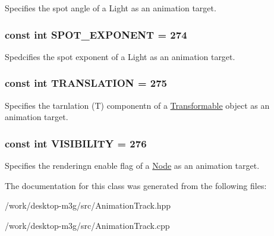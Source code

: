 Specifies the spot angle of a Light as an animation target. \hypertarget{classm3g_1_1AnimationTrack_90c55bd356e55166244416c6f758ea94}{
\subsubsection[{SPOT\_\-EXPONENT}]{\setlength{\rightskip}{0pt plus 5cm}const int {\bf SPOT\_\-EXPONENT} = 274}}
\label{classm3g_1_1AnimationTrack_90c55bd356e55166244416c6f758ea94}


Spedcifies the spot exponent of a Light as an animation target. \hypertarget{classm3g_1_1AnimationTrack_a691826dccd8c22144e61216de4f680c}{
\subsubsection[{TRANSLATION}]{\setlength{\rightskip}{0pt plus 5cm}const int {\bf TRANSLATION} = 275}}
\label{classm3g_1_1AnimationTrack_a691826dccd8c22144e61216de4f680c}


Specifies the tarnlation (T) componentn of a \hyperlink{classm3g_1_1Transformable}{Transformable} object as an animation target. \hypertarget{classm3g_1_1AnimationTrack_f248c44b5d4962472c6533cdeffc6fe9}{
\subsubsection[{VISIBILITY}]{\setlength{\rightskip}{0pt plus 5cm}const int {\bf VISIBILITY} = 276}}
\label{classm3g_1_1AnimationTrack_f248c44b5d4962472c6533cdeffc6fe9}


Specifies the renderingn enable flag of a \hyperlink{classm3g_1_1Node}{Node} as an animation target. 

The documentation for this class was generated from the following files:\begin{CompactItemize}
\item 
/work/desktop-m3g/src/AnimationTrack.hpp\item 
/work/desktop-m3g/src/AnimationTrack.cpp\end{CompactItemize}
